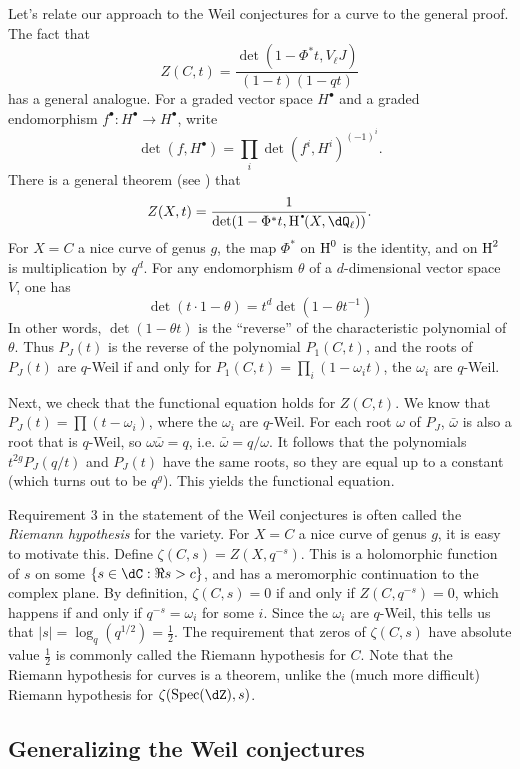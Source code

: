 Let's relate our approach to the Weil conjectures for a curve to the general 
proof. The fact that 
\[
  Z(C,t) = \frac{\det(1-\Phi^\ast t,V_\ell J)}{(1-t)(1-q t)}
\]
has a general analogue. For a graded vector space $H^\bullet$ and a graded 
endomorphism $f^\bullet:H^\bullet \to H^\bullet$, write 
\[
  \det(f,H^\bullet) = \prod_i \det(f^i, H^i)^{(-1)^i} \text{.}
\]
There is a general theorem (see \cite[1.5.4]{de74}) that
\[
  Z(X,t) = \frac{1}{\det(1-\Phi^\ast t,\h^\bullet(X,\dQ_\ell))} \text{.}
\]
For $X=C$ a nice curve of genus $g$, the map $\Phi^\ast$ on $\operatorname{H}^0$ is 
the identity, and on $\operatorname{H}^2$ is multiplication by $q^d$. For any endomorphism 
$\theta$ of a $d$-dimensional vector space $V$, one has 
\[
  \det(t\cdot 1-\theta) = t^d \det(1-\theta t^{-1})
\]
In other words, $\det(1-\theta t)$ is the ``reverse'' of the characteristic 
polynomial of $\theta$. Thus $P_J(t)$ is the reverse of the polynomial 
$P_1(C,t)$, and the roots of $P_J(t)$ are 
$q$-Weil if and only for $P_1(C,t) = \prod_i (1-\omega_i t)$, the 
$\omega_i$ are $q$-Weil. 

Next, we check that the functional equation holds for $Z(C,t)$. We know that 
$P_J(t) = \prod (t-\omega_i)$, where the $\omega_i$ are $q$-Weil. For each 
root $\omega$ of $P_J$, $\bar\omega$ is also a root that is $q$-Weil, so 
$\omega \bar\omega = q$, i.e. $\bar\omega = q/\omega$. It follows that the 
polynomials $t^{2 g} P_J(q/t)$ and $P_J(t)$ have the same roots, so they are 
equal up to a constant (which turns out to be $q^g$). This yields the 
functional equation.

Requirement 3 in the statement of the Weil conjectures is often called the 
\emph{Riemann hypothesis} for the variety. For $X=C$ a nice curve of genus 
$g$, it is easy to motivate this. Define $\zeta(C,s) = Z(X,q^{-s})$. This is a 
holomorphic function of $s$ on some $\{s\in \dC:\Re s>c\}$, and has a 
meromorphic continuation to the complex plane. By definition, 
$\zeta(C,s) = 0$ if and only if $Z(C,q^{-s}) = 0$, which happens if and only if 
$q^{-s} = \omega_i$ for some $i$. Since the $\omega_i$ are $q$-Weil, this tells 
us that $|s|=\log_q(q^{1/2}) = \frac 1 2$. The requirement that zeros of 
$\zeta(C,s)$ have absolute value $\frac 1 2$ is commonly called the Riemann 
hypothesis for $C$. Note that the Riemann hypothesis for curves is a theorem, 
unlike the (much more difficult) Riemann hypothesis for $\zeta(\spec(\dZ),s)$. 





\subsection{Generalizing the Weil conjectures}


